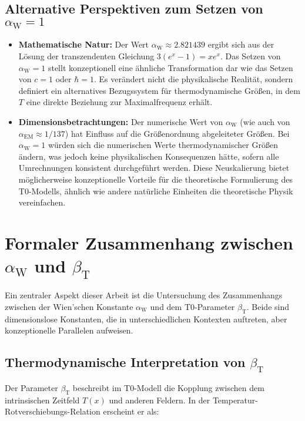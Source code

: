 \documentclass[12pt,a4paper]{article}
\newcommand{\Tfield}{T(x)}
\newcommand{\betaT}{\beta_{\text{T}}}
\newcommand{\alphaEM}{\alpha_{\text{EM}}}
\newcommand{\alphaW}{\alpha_{\text{W}}}
\begin{document}
	\subsection{Alternative Perspektiven zum Setzen von \(\alphaW = 1\)}
	
	\begin{itemize}
		\item \textbf{Mathematische Natur:} Der Wert \(\alphaW \approx 2.821439\) ergibt sich aus der Lösung der transzendenten Gleichung \(3(e^x - 1) = xe^x\). Das Setzen von \(\alphaW = 1\) stellt konzeptionell eine ähnliche Transformation dar wie das Setzen von \(c = 1\) oder \(\hbar = 1\). Es verändert nicht die physikalische Realität, sondern definiert ein alternatives Bezugssystem für thermodynamische Größen, in dem \(T\) eine direkte Beziehung zur Maximalfrequenz erhält.
		\item \textbf{Dimensionsbetrachtungen:} Der numerische Wert von \(\alphaW\) (wie auch von \(\alphaEM \approx 1/137\)) hat Einfluss auf die Größenordnung abgeleiteter Größen. Bei \(\alphaW = 1\) würden sich die numerischen Werte thermodynamischer Größen ändern, was jedoch keine physikalischen Konsequenzen hätte, sofern alle Umrechnungen konsistent durchgeführt werden. Diese Neuskalierung bietet möglicherweise konzeptionelle Vorteile für die theoretische Formulierung des T0-Modells, ähnlich wie andere natürliche Einheiten die theoretische Physik vereinfachen.
	\end{itemize}
	
	\section{Formaler Zusammenhang zwischen \(\alphaW\) und \(\betaT\)}
	
	Ein zentraler Aspekt dieser Arbeit ist die Untersuchung des Zusammenhangs zwischen der Wien'schen Konstante \(\alphaW\) und dem T0-Parameter \(\betaT\). Beide sind dimensionslose Konstanten, die in unterschiedlichen Kontexten auftreten, aber konzeptionelle Parallelen aufweisen.
	
	\subsection{Thermodynamische Interpretation von \(\betaT\)}
	
	Der Parameter \(\betaT\) beschreibt im T0-Modell die Kopplung zwischen dem intrinsischen Zeitfeld \(\Tfield\) und anderen Feldern. In der Temperatur-Rotverschiebungs-Relation erscheint er als:
	
\end{document}
